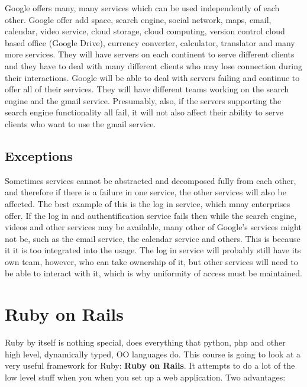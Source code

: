 \documentclass[11pt]{article}
\begin{document}
Google offers many, many services which can be used independently of each other. Google offer add space, search engine, social network, maps, email, calendar, video service, cloud storage, cloud computing, version control cloud based office (Google Drive), currency converter, calculator, translator and many more services. They will have servers on each continent to serve different clients and they have to deal with many different clients who may lose connection during their interactions. Google will be able to deal with servers failing and continue to offer all of their services. They will have different teams working on the search engine and the gmail service. Presumably, also, if the servers supporting the search engine functionality all fail, it will not also affect their ability to serve clients who want to use the gmail service.

\subsection{Exceptions}

Sometimes services cannot be abstracted and decomposed fully from each other, and therefore if there is a failure in one service, the other services will also be affected. The best example of this is the log in service, which mnay enterprises offer. If the log in and authentification service fails then while the search engine, videos and other services may be available, many other of Google's services might not be, such as the email service, the calendar service and others. This is because it it is too integrated into the usage. The log in service will probably still have its own team, however, who can take ownership of it, but other services will need to be able to interact with it, which is why uniformity of access must be maintained.



\section{Ruby on Rails}

Ruby by itself is nothing special, does everything that python, php and other high level, dynamically typed, OO languages do. This course is going to look at a very useful framework for Ruby: \textbf{Ruby on Rails}. It attempts to do a lot of the low level stuff when you when you set up a web application. Two advantages:
\end{document}
